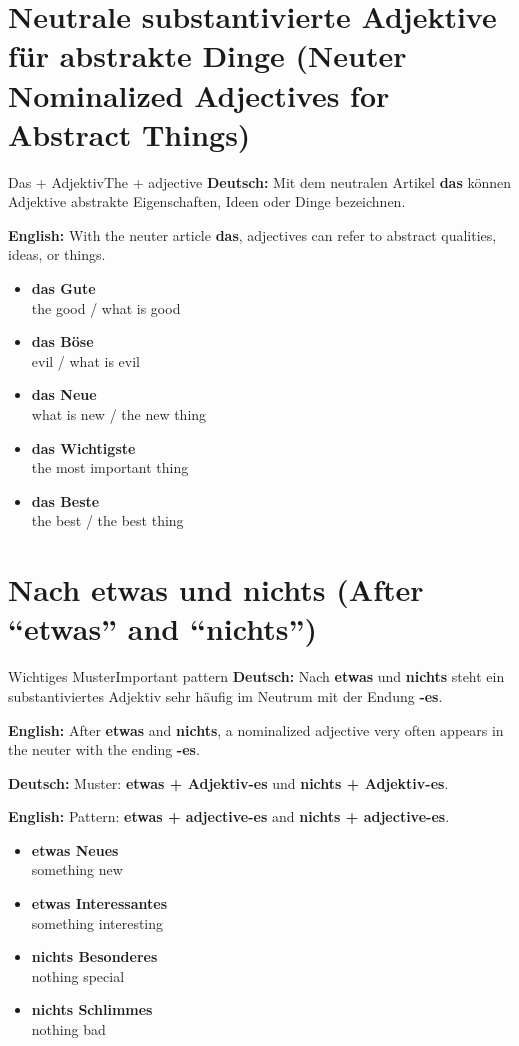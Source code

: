 \documentclass[a4paper,11pt]{article}
\newcommand{\GermanText}[1]{\textbf{Deutsch: }#1\par}
\newcommand{\EnglishText}[1]{{\small\color{SoftGray}\textbf{English: }#1\par}}
\newcommand{\ExampleItem}[2]{\item \textbf{#1}\\{\small\color{SoftGray}#2}}
\begin{document}
\section{Neutrale substantivierte Adjektive für abstrakte Dinge \textnormal{(Neuter Nominalized Adjectives for Abstract Things)}}
\begin{grammarentry}{Das + Adjektiv}{The + adjective}
\GermanText{Mit dem neutralen Artikel \textbf{das} können Adjektive abstrakte Eigenschaften, Ideen oder Dinge bezeichnen.}
\EnglishText{With the neuter article \textbf{das}, adjectives can refer to abstract qualities, ideas, or things.}
\end{grammarentry}
\begin{exbox}
\begin{itemize}
\ExampleItem{das \textbf{Gute}}{the good / what is good}
\ExampleItem{das \textbf{Böse}}{evil / what is evil}
\ExampleItem{das \textbf{Neue}}{what is new / the new thing}
\ExampleItem{das \textbf{Wichtigste}}{the most important thing}
\ExampleItem{das \textbf{Beste}}{the best / the best thing}
\end{itemize}
\end{exbox}

\section{Nach \glqq etwas\grqq{} und \glqq nichts\grqq{} \textnormal{(After ``etwas'' and ``nichts'')}}
\begin{grammarentry}{Wichtiges Muster}{Important pattern}
\GermanText{Nach \textbf{etwas} und \textbf{nichts} steht ein substantiviertes Adjektiv sehr häufig im Neutrum mit der Endung \textbf{-es}.}
\EnglishText{After \textbf{etwas} and \textbf{nichts}, a nominalized adjective very often appears in the neuter with the ending \textbf{-es}.}
\GermanText{Muster: \textbf{etwas + Adjektiv-es} und \textbf{nichts + Adjektiv-es}.}
\EnglishText{Pattern: \textbf{etwas + adjective-es} and \textbf{nichts + adjective-es}.}
\end{grammarentry}
\begin{exbox}
\begin{itemize}
\ExampleItem{etwas \textbf{Neues}}{something new}
\ExampleItem{etwas \textbf{Interessantes}}{something interesting}
\ExampleItem{nichts \textbf{Besonderes}}{nothing special}
\ExampleItem{nichts \textbf{Schlimmes}}{nothing bad}
\end{itemize}
\end{exbox}
\end{document}
